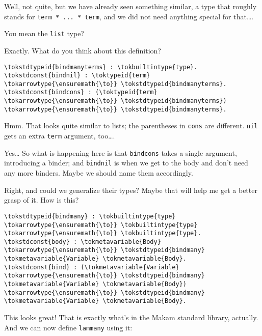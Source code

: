 \heroADVISOR{} Well, not quite, but we have already seen something similar, a
type that roughly stands for \texttt{term\ *\ ...\ *\ term}, and we did
not need anything special for that\ldots{}.

\heroSTUDENT{} You mean the \texttt{list} type?

\heroADVISOR{} Exactly. What do you think about this definition?

\begin{verbatim}
\tokstdtypeid{bindmanyterms} : \tokbuiltintype{type}.
\tokstdconst{bindnil} : \toktypeid{term} \tokarrowtype{\ensuremath{\to}} \tokstdtypeid{bindmanyterms}.
\tokstdconst{bindcons} : (\toktypeid{term} \tokarrowtype{\ensuremath{\to}} \tokstdtypeid{bindmanyterms}) \tokarrowtype{\ensuremath{\to}} \tokstdtypeid{bindmanyterms}.
\end{verbatim}

\heroSTUDENT{} Hmm. That looks quite similar to lists; the parentheses in
\texttt{cons} are different. \texttt{nil} gets an extra \texttt{term}
argument, too\ldots{}.

\heroADVISOR{} Yes\ldots{} So what is happening here is that \texttt{bindcons}
takes a single argument, introducing a binder; and \texttt{bindnil} is
when we get to the body and don't need any more binders. Maybe we should
name them accordingly.

\heroSTUDENT{} Right, and could we generalize their types? Maybe that will
help me get a better grasp of it. How is this?

\importantCodeblock{}

\begin{verbatim}
\tokstdtypeid{bindmany} : \tokbuiltintype{type} \tokarrowtype{\ensuremath{\to}} \tokbuiltintype{type} \tokarrowtype{\ensuremath{\to}} \tokbuiltintype{type}.
\tokstdconst{body} : \tokmetavariable{Body} \tokarrowtype{\ensuremath{\to}} \tokstdtypeid{bindmany} \tokmetavariable{Variable} \tokmetavariable{Body}.
\tokstdconst{bind} : (\tokmetavariable{Variable} \tokarrowtype{\ensuremath{\to}} \tokstdtypeid{bindmany} \tokmetavariable{Variable} \tokmetavariable{Body}) \tokarrowtype{\ensuremath{\to}} \tokstdtypeid{bindmany} \tokmetavariable{Variable} \tokmetavariable{Body}.
\end{verbatim}

\importantCodeblockEnd{}

\heroADVISOR{} This looks great! That is exactly what's in the Makam standard
library, actually. And we can now define \texttt{lammany} using it:

